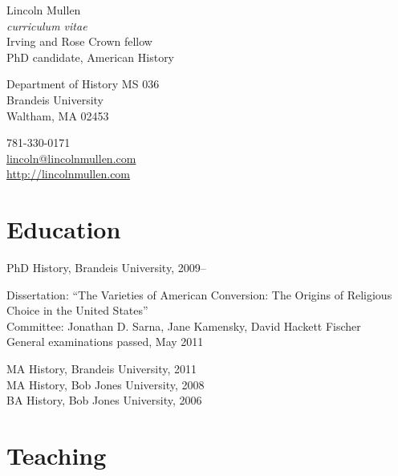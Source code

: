 \documentclass[11pt]{article}
\begin{document}
{\LARGE Lincoln Mullen}\\
\emph{curriculum vitae}\\[0.5cm]

Irving and Rose Crown fellow\\
PhD candidate, American History

\begin{multicols}{2}
Department of History MS 036\\
Brandeis University\\
Waltham, MA 02453

\columnbreak

781-330-0171\\
\href{mailto:lincoln@lincolnmullen.com}{lincoln@lincolnmullen.com}\\
\href{http://lincolnmullen.com}{http://lincolnmullen.com}
\end{multicols}


\vskip 0.5cm


\section{Education}
PhD History, Brandeis University, 2009--

\begingroup
{}
Dissertation: ``The Varieties of American Conversion: The Origins of 
Religious Choice in the United States''\\[1pt]
Committee:  Jonathan D. Sarna, Jane Kamensky, David Hackett 
Fischer\\[1pt]
General examinations passed, May 2011
\par
\endgroup

MA History, Brandeis University, 2011\\
MA History, Bob Jones University, 2008\\
BA History, Bob Jones University, 2006




\section{Teaching}
\end{document}
